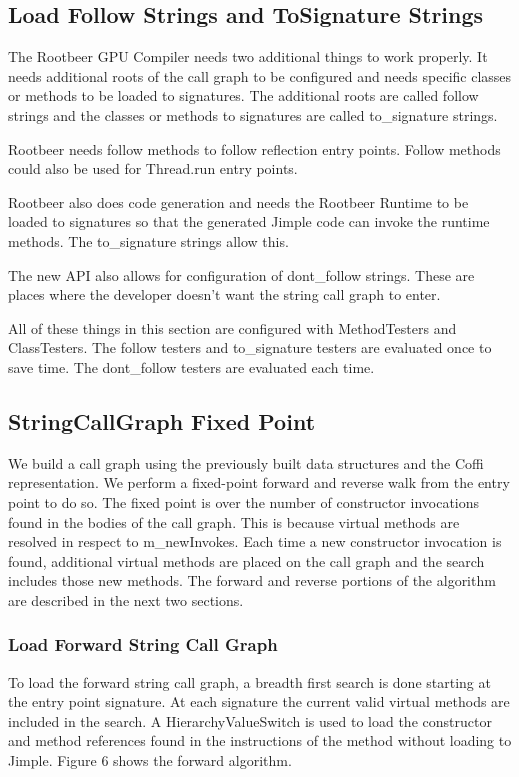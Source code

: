 \documentclass[preprint]{sigplanconf}
\begin{document}
\subsection{Load Follow Strings and ToSignature Strings}
The Rootbeer GPU Compiler needs two additional things to work properly. It needs additional roots of the call graph to be configured and needs specific classes or methods to be loaded to signatures. The additional roots are called follow strings and the classes or methods to signatures are called to\_signature strings.

Rootbeer needs follow methods to follow reflection entry points. Follow methods could also be used for Thread.run entry points.
 
Rootbeer also does code generation and needs the Rootbeer Runtime to be loaded to signatures so that the generated Jimple code can invoke the runtime methods. The to\_signature strings allow this. 

The new API also allows for configuration of dont\_follow strings. These are places where the developer doesn’t want the string call graph to enter.

All of these things in this section are configured with MethodTesters and ClassTesters. The follow testers and to\_signature testers are evaluated once to save time. The dont\_follow testers are evaluated each time.

\subsection{StringCallGraph Fixed Point}
We build a call graph using the previously built data structures and the Coffi representation. We perform a fixed-point forward and reverse walk from the entry point to do so. The fixed point is over the number of constructor invocations found in the bodies of the call graph. This is because virtual methods are resolved in respect to m\_newInvokes. Each time a new constructor invocation is found, additional virtual methods are placed on the call graph and the search includes those new methods. The forward and reverse portions of the algorithm are described in the next two sections.

\subsubsection{Load Forward String Call Graph}
To load the forward string call graph, a breadth first search is done starting at the entry point signature. At each signature the current valid virtual methods are included in the search. A HierarchyValueSwitch is used to load the constructor and method references found in the instructions of the method without loading to Jimple. Figure 6 shows the forward algorithm. 
\end{document}
